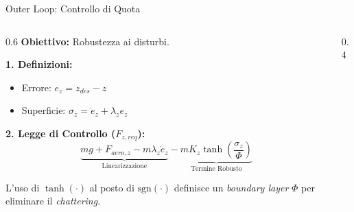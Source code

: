 \documentclass[aspectratio=169]{beamer} %
\begin{document}
\begin{frame}{Outer Loop: Controllo di Quota}
    
    \begin{columns}[T]
        \begin{column}{0.6\textwidth}
            \textbf{Obiettivo:} Robustezza ai disturbi.
            
            \vspace{0.2cm}
            \textbf{1. Definizioni:}
            \begin{itemize}
                \item Errore: $e_z = z_{des} - z$
                \item Superficie: $\sigma_z = \dot{e}_z + \lambda_z e_z$
            \end{itemize}
            
            \vspace{0.3cm}
            \textbf{2. Legge di Controllo ($F_{z,req}$):}
            \begin{equation*}
                 \underbrace{mg + F_{aero,z} - m \lambda_z \dot{e}_z}_{\text{Linearizzazione}} - \underbrace{m K_z \tanh\left(\frac{\sigma_z}{\Phi}\right)}_{\text{Termine Robusto}}
            \end{equation*}
            
            \vspace{0.2cm}
            \small
            L'uso di $\tanh(\cdot)$ al posto di $\text{sgn}(\cdot)$ definisce un \textit{boundary layer} $\Phi$ per eliminare il \textit{chattering}.
        \end{column}
        
        \begin{column}{0.4\textwidth}
            \centering
            \vspace{0.5cm}
\end{column}
\end{columns}
\end{frame}
\end{document}
